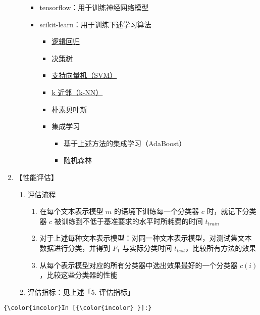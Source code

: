 \documentclass[11pt]{article}
\providecommand{\tightlist}{%
      \setlength{\itemsep}{0pt}\setlength{\parskip}{0pt}}
\begin{document}
\begin{enumerate}
\begin{itemize}
    \begin{itemize}
    \tightlist
    \item
      tensorflow：用于训练神经网络模型
    \item
      scikit-learn：用于训练下述学习算法

      \begin{itemize}
      \tightlist
      \item
        \href{http://scikit-learn.org/stable/modules/linear_model.html\#logistic-regression}{逻辑回归}
      \item
        \href{http://scikit-learn.org/stable/modules/tree.html}{决策树}
      \item
        \href{http://scikit-learn.org/stable/modules/svm.html}{支持向量机（SVM）}
      \item
        \href{http://scikit-learn.org/stable/modules/generated/sklearn.neighbors.KNeighborsClassifier.html\#sklearn.neighbors.KNeighborsClassifier}{k
        近邻（k-NN）}
      \item
        \href{http://scikit-learn.org/stable/modules/naive_bayes.html}{朴素贝叶斯}
      \item
        集成学习

        \begin{itemize}
        \tightlist
        \item
          基于上述方法的集成学习（AdaBoost）
        \item
          随机森林
        \end{itemize}
      \end{itemize}
    \end{itemize}
  \end{itemize}
\item
  【性能评估】

  \begin{enumerate}
  \def\labelenumii{\arabic{enumii}.}
  \tightlist
  \item
    评估流程

    \begin{enumerate}
    \def\labelenumiii{\arabic{enumiii}.}
    \tightlist
    \item
      在每个文本表示模型 \(m\) 的语境下训练每一个分类器 \(c\)
      时，就记下分类器 \(c\) 被训练到不低于基准要求的水平时所耗费的时间
      \(t_{train}\)
    \item
      对于上述每种文本表示模型：对同一种文本表示模型，对测试集文本数据进行分类，并得到
      \(F_1\) 与实际分类时间 \(t_{test}\)，比较所有方法的效果
    \item
      从每个表示模型对应的所有分类器中选出效果最好的一个分类器
      \(c(i)\)，比较这些分类器的性能
    \end{enumerate}
  \item
    评估指标：见上述「5. 评估指标」
  \end{enumerate}
\end{enumerate}

    \begin{Verbatim}[commandchars=\\\{\}]
{\color{incolor}In [{\color{incolor} }]:} 
\end{Verbatim}


    
    
    
    
\end{document}
